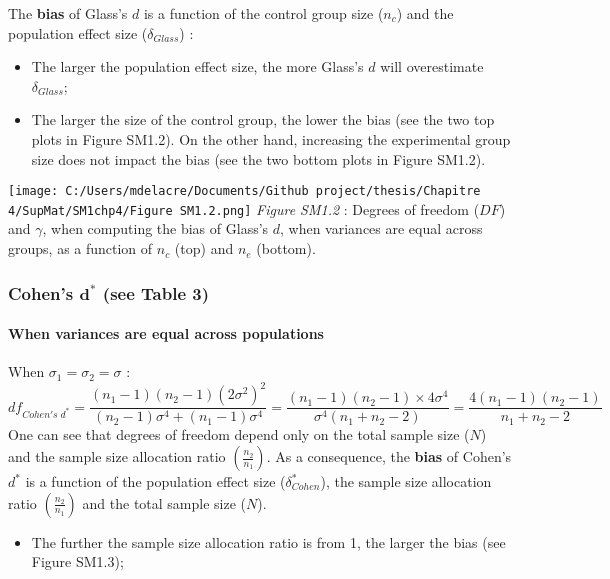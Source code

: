 \documentclass[
  english,
  man,mask,floatsintext]{apa6}
\providecommand{\tightlist}{%
  \setlength{\itemsep}{0pt}\setlength{\parskip}{0pt}}
\let\oldparagraph\paragraph
\renewcommand{\paragraph}[1]{\oldparagraph{#1}\mbox{}}
\begin{document}
The \textbf{bias} of Glass's \(d\) is a function of the control group size (\(n_c\)) and the population effect size (\(\delta_{Glass}\)) :

\begin{itemize}
\item
  The larger the population effect size, the more Glass's \(d\) will overestimate \(\delta_{Glass}\);
\item
  The larger the size of the control group, the lower the bias (see the two top plots in Figure SM1.2). On the other hand, increasing the experimental group size does not impact the bias (see the two bottom plots in Figure SM1.2).
\end{itemize}

\texttt{[image: C:/Users/mdelacre/Documents/Github project/thesis/Chapitre 4/SupMat/SM1chp4/Figure SM1.2.png]}
\emph{Figure SM1.2} : Degrees of freedom (\(DF\)) and \(\gamma\), when computing the bias of Glass's \(d\), when variances are equal across groups, as a function of \(n_c\) (top) and \(n_e\) (bottom).
\newpage

\hypertarget{cohens-bmd-see-table-3}{%
\subsubsection{\texorpdfstring{Cohen's \(\bm{d^*}\) (see Table 3)}{Cohen's \textbackslash bm\{d\^{}*\} (see Table 3)}}\label{cohens-bmd-see-table-3}}

\hypertarget{when-variances-are-equal-across-populations}{%
\paragraph{When variances are equal across populations}\label{when-variances-are-equal-across-populations}}

When \(\sigma_1=\sigma_2=\sigma\) :
\[df_{Cohen's \; d^*} = \frac{(n_1-1)(n_2-1)(2\sigma^2)^2}{(n_2-1)\sigma^4+(n_1-1)\sigma^4} = \frac{(n_1-1)(n_2-1)\times 4\sigma^4}{\sigma^4(n_1+n_2-2)} = \frac{4(n_1-1)(n_2-1)}{n_1+n_2-2}\]
One can see that degrees of freedom depend only on the total sample size (\(N\)) and the sample size allocation ratio \(\left( \frac{n_2}{n_1}\right)\). As a consequence, the \textbf{bias} of Cohen's \(d^*\) is a function of the population effect size (\(\delta^*_{Cohen}\)), the sample size allocation ratio \(\left( \frac{n_2}{n_1}\right)\) and the total sample size (\(N\)).

\begin{itemize}
\tightlist
\item
  The further the sample size allocation ratio is from 1, the larger the bias (see Figure SM1.3);
\end{itemize}
\end{document}

